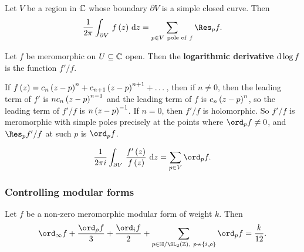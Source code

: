 \begin{theorem}
Let $ V $ be a region in $ \mathbb{C} $ whose boundary $ \partial V $ is a simple closed curve. Then
$$ \dfrac{1}{2\pi}\intd{\partial V}{}{f\br{z}}{z} = \sum_{p \in V \ \text{pole of} \ f} \Res_p f. $$
\end{theorem}

\begin{definition}
Let $ f $ be meromorphic on $ U \subseteq \mathbb{C} $ open. Then the \textbf{logarithmic derivative} $ \mathrm{d}\log f $ is the function $ f' / f $.
\end{definition}

If $ f\br{z} = c_n\br{z - p}^n + c_{n + 1}\br{z - p}^{n + 1} + \dots $, then if $ n \ne 0 $, then the leading term of $ f' $ is $ nc_n\br{z - p}^{n - 1} $ and the leading term of $ f $ is $ c_n\br{z - p}^n $, so the leading term of $ f' / f $ is $ n\br{z - p}^{-1} $. If $ n = 0 $, then $ f' / f $ is holomorphic. So $ f' / f $ is meromorphic with simple poles precisely at the points where $ \ord_p f \ne 0 $, and $ \Res_p f' / f $ at such $ p $ is $ \ord_p f $.

\begin{theorem}
$$ \dfrac{1}{2\pi i}\intd{\partial V}{}{\dfrac{f'\br{z}}{f\br{z}}}{z} = \sum_{p \in V} \ord_p f. $$
\end{theorem}

\pagebreak

\subsubsection{Controlling modular forms}

\begin{theorem}
Let $ f $ be a non-zero meromorphic modular form of weight $ k $. Then
$$ \ord_\infty f + \dfrac{\ord_\rho f}{3} + \dfrac{\ord_i f}{2} + \sum_{p \in \HH / \SL_2\br{\ZZ}, \ p \nsim \cbr{i, \rho}} \ord_p f = \dfrac{k}{12}. $$
\end{theorem}

